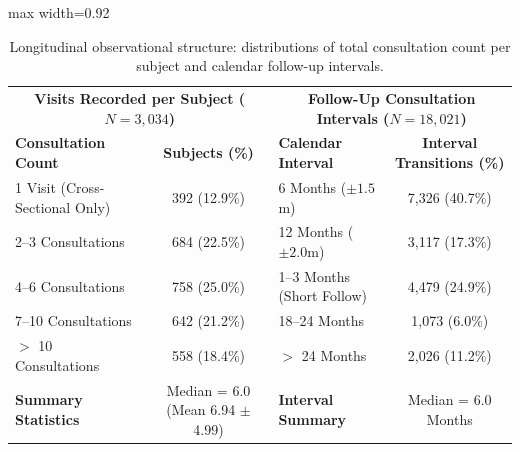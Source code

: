 \begin{table}[t]
\centering
\caption{Longitudinal observational structure: distributions of total consultation count per subject and calendar follow-up intervals.}
\label{tab:visit_distributions}
\small
\begin{adjustbox}{max width=0.92\linewidth}
\begin{tabular}{lc|lc}
\toprule
\multicolumn{2}{c|}{\textbf{Visits Recorded per Subject ($N = 3,034$)}} & \multicolumn{2}{c}{\textbf{Follow-Up Consultation Intervals ($N = 18,021$)}} \\
\textbf{Consultation Count} & \textbf{Subjects (\%)} & \textbf{Calendar Interval} & \textbf{Interval Transitions (\%)} \\
\midrule
1 Visit (Cross-Sectional Only) & 392 (12.9\%)       & 6 Months ($\pm 1.5$m)      & 7,326 (40.7\%) \\
2--3 Consultations             & 684 (22.5\%)       & 12 Months ($\pm 2.0$m)     & 3,117 (17.3\%) \\
4--6 Consultations             & 758 (25.0\%)       & 1--3 Months (Short Follow) & 4,479 (24.9\%) \\
7--10 Consultations            & 642 (21.2\%)       & 18--24 Months              & 1,073 (6.0\%) \\
$>$ 10 Consultations           & 558 (18.4\%)       & $>$ 24 Months              & 2,026 (11.2\%) \\
\midrule
\textbf{Summary Statistics}    & Median = 6.0 (Mean 6.94 $\pm$ 4.99) & \textbf{Interval Summary} & Median = 6.0 Months \\
\bottomrule
\end{tabular}
\end{adjustbox}
\end{table}
